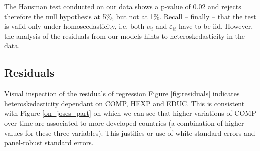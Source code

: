 \documentclass[12pt,a4paper]{article}\usepackage[]{graphicx}\usepackage[]{color}
\begin{document}
The Hausman test conducted on our data shows a p-value of 0.02 and rejects therefore the null hypothesis at 5\%, but not at 1\%. Recall -- finally -- that the test is valid only under homoscedasticity, i.e. both $\alpha_i$ and $\varepsilon_{it}$ have to be iid. However, the analysis of the residuals from our models hints to heteroskedasticity in the data.


\subsection{Residuals}
Visual inspection of the residuals of regression Figure \ref{fig:residuals} indicates heteroskedasticity dependant on COMP, HEXP and EDUC. This is consistent with Figure \ref{on_joses_part} on which we can see that higher variations of COMP over time are associated to more developed countries (a combination of higher values for these three variables). This justifies or use of white standard errors and panel-robust standard errors. 


\end{document}
